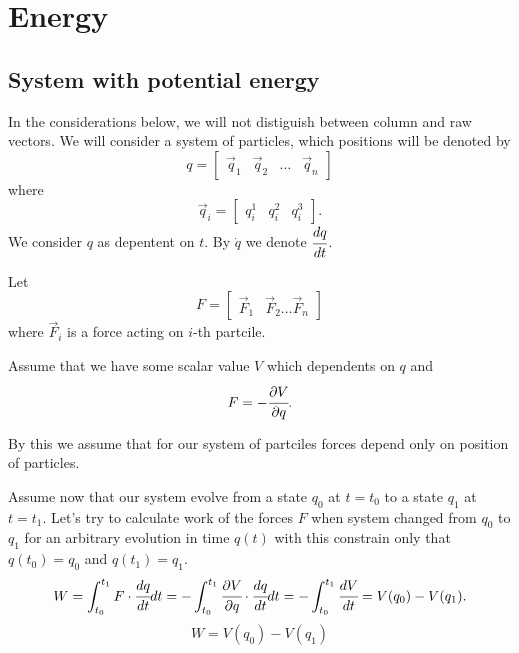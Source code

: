 \documentclass[main.tex]{subfiles}
\begin{document}
\section{Energy}
\subsection{System with potential energy}
\label{potential_energy}
In the considerations below, we will not distiguish between column and raw vectors.
We will consider a system of particles, which positions will be denoted by
\begin{equation}
q = 
\begin{bmatrix}
\vec{q}_1 &
\vec{q}_2 &
\dots &
\vec{q}_n 
\end{bmatrix}
\end{equation}
where
\begin{equation}
\vec{q}_i = 
\begin{bmatrix}
q^1_i & 
q^2_i & 
q^3_i
\end{bmatrix}.
\end{equation}
We consider $q$ as depentent on $t$. By $\dot{q}$ we denote $\cfrac{dq}{dt}$.


Let
\begin{equation}
F = 
\begin{bmatrix}
\vec{F}_1 & \vec{F}_2 \dots \vec{F}_n
\end{bmatrix}
\end{equation} 
where $\vec{F}_i$ is a force acting on $i$-th partcile.

Assume that we have some scalar value $V$ which dependents on $q$ and
\begin{equation}
\label{force_in_potential}
F = -\cfrac{\partial V}{\partial q}.
\end{equation}

By this we assume that for our system of partciles forces depend only on position of particles.

Assume now that our system evolve from a state $q_0$ at $t=t_0$ to a state $q_1$ at $t=t_1$. Let's try to calculate work of the forces $F$ when system changed from $q_0$ to $q_1$ for an arbitrary evolution in time $q(t)$ with this constrain only that $q(t_0) = q_0$ and $q(t_1) = q_1$.
\begin{equation}
W = \int_{t_0}^{t_1} F\cdot \cfrac{dq}{dt} dt=-\int_{t_0}^{t_1} \cfrac{\partial V}{\partial q}\cdot \cfrac{dq}{dt} dt = - \int_{t_0}^{t_1} \cfrac{dV}{dt} = V(q_0) - V(q_1).
\end{equation}
\begin{equation}
\boxed{
W = V(q_0) - V(q_1)
}
\end{equation}
\end{document}
